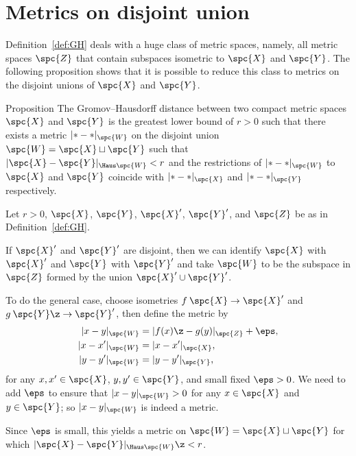 \section{Metrics on disjoint union}

Definition~\ref{def:GH} deals with a huge class of metric spaces,
namely, all metric spaces $\spc{Z}$ that contain subspaces isometric to $\spc{X}$ and $\spc{Y}$.
The following proposition shows that it is possible to reduce this class to metrics on the disjoint unions of $\spc{X}$ and $\spc{Y}$. 

\begin{thm}{Proposition}\label{prop:GH=X+Y}
The Gromov--Hausdorff distance between two compact metric spaces $\spc{X}$
and $\spc{Y}$ is the greatest lower bound of $r>0$ such that there exists a metric
$|{*}-{*}|_{\spc{W}}$ on the disjoint union $\spc{W}=\spc{X}\sqcup \spc{Y}$ 
such that $|\spc{X}-\spc{Y}|_{\Haus\spc{W}} < r$
and 
the restrictions of $|{*}-{*}|_{\spc{W}}$ to $\spc{X}$ and $\spc{Y}$
coincide with $|{*}-{*}|_\spc{X}$ and $|{*}-{*}|_{\spc{Y}}$ 
respectively. 
\end{thm}

Let $r>0$, $\spc{X}$, $\spc{Y}$, $\spc{X}'$, $\spc{Y}'$, and $\spc{Z}$ be as in Definition~\ref{def:GH}.

If  $\spc{X}'$ and $\spc{Y}'$ are disjoint, then we can identify $\spc{X}$ with  $\spc{X}'$ and $\spc{Y}$ with $\spc{Y}'$ and take $\spc{W}$ to be the subspace in $\spc{Z}$ formed by the union $\spc{X}'\cup\spc{Y}'$.

To do the general case,
choose isometries $f\: \spc{X} \to \spc{X}'$ and
$g\: \spc{Y} \z\to \spc{Y}'$, then define the metric by
\begin{align*}
|x-y|_{\spc{W}} &= |f (x)\z- g(y)|_{\spc{Z}}+\eps,
\\
|x-x'|_{\spc{W}} &= |x- x'|_{\spc{X}},
\\
|y-y'|_{\spc{W}} &= |y- y'|_{\spc{Y}},
\end{align*}
for any $x,x' \in \spc{X}$, $y,y' \in \spc{Y}$, and small fixed $\eps>0$.
We need to add $\eps$ to ensure that $|x-y|_{\spc{W}} > 0$ for any $x\in \spc{X}$ and $y\in \spc{Y}$;
so $|x-y|_{\spc{W}}$ is indeed a metric.

Since $\eps$ is small,
this yields a metric on $\spc{W}=\spc{X}\sqcup \spc{Y}$ for which
$|\spc{X}- \spc{Y}|_{\Haus\spc{W}} \z< r$.
\qeds





















